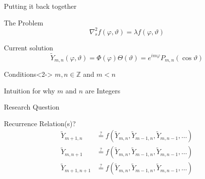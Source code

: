 \documentclass[xetex, onlymath, aspectratio=169]{beamer}
\begin{document}
\begin{frame}{Putting it back together}
	\begin{block}{The Problem}
		\[
			\nabla^2_s f(\varphi, \vartheta) = \lambda f(\varphi, \vartheta)
		\]
	\end{block}
	\begin{alertblock}{Current solution}
  	\[
			\tilde{Y}_{m, n}(\varphi, \vartheta)
				= \Phi(\varphi) \Theta(\vartheta)
				= e^{im\varphi} P_{m, n}(\cos\vartheta)
  	\]
	\end{alertblock}
	\begin{block}{Conditions}<2->
		\(m, n \in \mathbb{Z}\) and \(m < n\)
	\end{block}
\end{frame}

\bgroup
{}
\begin{frame}{Intuition for why \(m\) and \(n\) are Integers}
\end{frame}
\egroup



\begin{frame}{Research Question}
	\begin{block}{Recurrence Relation(s)?}
		\begin{align*}
			\tilde{Y}_{m+1, n} &\stackrel{?}{=} f(\tilde{Y}_{m, n}, \tilde{Y}_{m-1, n}, \tilde{Y}_{m, n-1}, \ldots) \\
			\tilde{Y}_{m, n+1} &\stackrel{?}{=} f(\tilde{Y}_{m, n}, \tilde{Y}_{m-1, n}, \tilde{Y}_{m, n-1}, \ldots) \\
			\tilde{Y}_{m+1, n+1} &\stackrel{?}{=} f(\tilde{Y}_{m, n}, \tilde{Y}_{m-1, n}, \tilde{Y}_{m, n-1}, \ldots)
		\end{align*}
	\end{block}
\end{frame}
\end{document}
